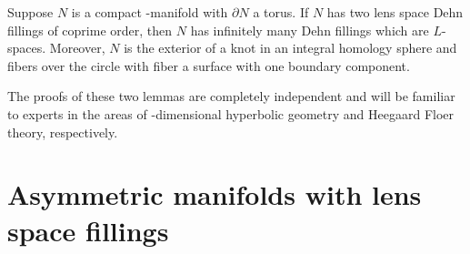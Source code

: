 \begin{lemma}\label{lem:floer}
  Suppose $N$ is a compact \3-manifold with $\partial N$ a torus.  If
  $N$ has two lens space Dehn fillings of 
  coprime order, then $N$ has infinitely many Dehn fillings which are
  $L$-spaces.  Moreover, $N$ is the exterior of a knot in an integral
  homology sphere and fibers over the circle with fiber a surface with
  one boundary component.
\end{lemma}

The proofs of these two lemmas are completely independent and will be
familiar to experts in the areas of \3-dimensional hyperbolic geometry and
Heegaard Floer theory, respectively. 


\section{Asymmetric manifolds with lens space fillings}\label{sect:comp}


